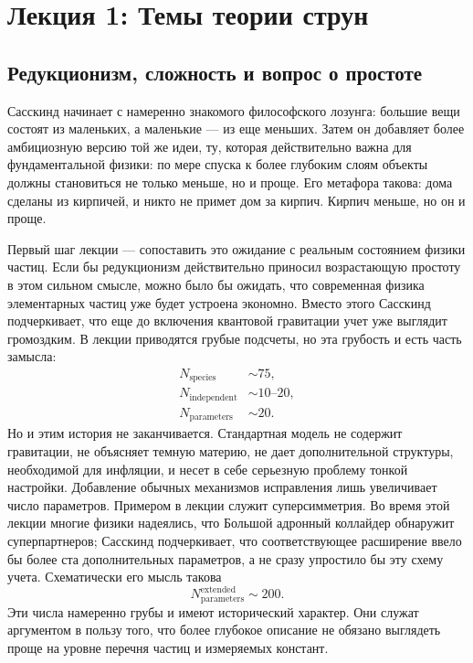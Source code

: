 \chapter{Лекция 1: Темы теории струн}


\section{Редукционизм, сложность и вопрос о простоте}

Сасскинд начинает с намеренно знакомого философского лозунга: большие вещи состоят из маленьких, а маленькие — из еще меньших. Затем он добавляет более амбициозную версию той же идеи, ту, которая действительно важна для фундаментальной физики: по мере спуска к более глубоким слоям объекты должны становиться не только меньше, но и проще. Его метафора такова: дома сделаны из кирпичей, и никто не примет дом за кирпич. Кирпич меньше, но он и проще.

Первый шаг лекции — сопоставить это ожидание с реальным состоянием физики частиц. Если бы редукционизм действительно приносил возрастающую простоту в этом сильном смысле, можно было бы ожидать, что современная физика элементарных частиц уже будет устроена экономно. Вместо этого Сасскинд подчеркивает, что еще до включения квантовой гравитации учет уже выглядит громоздким. В лекции приводятся грубые подсчеты, но эта грубость и есть часть замысла:
\begin{equation}
\begin{aligned}
N_{\mathrm{species}}&\sim 75,\\
N_{\mathrm{independent}}&\sim 10\text{--}20,\\
N_{\mathrm{parameters}}&\sim 20.
\end{aligned}
\end{equation}
Но и этим история не заканчивается. Стандартная модель не содержит гравитации, не объясняет темную материю, не дает дополнительной структуры, необходимой для инфляции, и несет в себе серьезную проблему тонкой настройки. Добавление обычных механизмов исправления лишь увеличивает число параметров. Примером в лекции служит суперсимметрия. Во время этой лекции многие физики надеялись, что Большой адронный коллайдер обнаружит суперпартнеров; Сасскинд подчеркивает, что соответствующее расширение ввело бы более ста дополнительных параметров, а не сразу упростило бы эту схему учета. Схематически его мысль такова
\begin{equation}
N_{\mathrm{parameters}}^{\mathrm{extended}} \sim 200.
\end{equation}
Эти числа намеренно грубы и имеют исторический характер. Они служат аргументом в пользу того, что более глубокое описание не обязано выглядеть проще на уровне перечня частиц и измеряемых констант.

